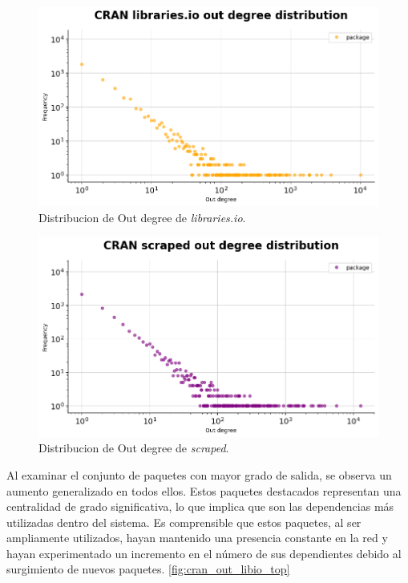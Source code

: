 \begin{figure}[h!]
    \begin{center}
        \includegraphics[width=1\textwidth]{img/cran/out_deg.png}
        \caption{Distribucion de Out degree de \textit{libraries.io}.}
        \label{fig:cran_out_lib}
    \end{center}
\end{figure}

\begin{figure}[h!]
    \begin{center}
        \includegraphics[width=1\textwidth]{img/cran/out_deg2.png}
        \caption{Distribucion de Out degree de \textit{scraped}.}
        \label{fig:cran_out_scraped}
    \end{center}
\end{figure}

Al examinar el conjunto de paquetes con mayor grado de salida, se observa un aumento generalizado
en todos ellos. Estos paquetes destacados representan una centralidad de grado significativa,
lo que implica que son las dependencias más utilizadas dentro del sistema. Es comprensible que
estos paquetes, al ser ampliamente utilizados, hayan mantenido una presencia constante en la
red y hayan experimentado un incremento en el número de sus dependientes debido al surgimiento
de nuevos paquetes. \ref{fig:cran_out_libio_top}

